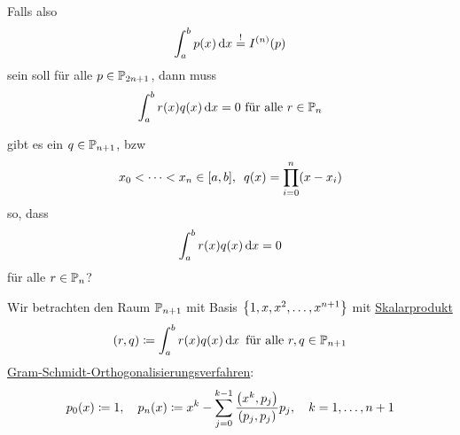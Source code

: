 \documentclass[../Skript.tex]{subfiles}
\begin{document}
Falls also \[
    \int_a^b p(x) \mathop{}\!\mathrm{d} x \overset{!}{=}I^{(n)}(p)\]
sein soll für alle $p\in\mathbb{P}_{2n+1}$, dann muss \[
    \int_a^b r(x) q(x) \mathop{}\!\mathrm{d} x = 0 \text{ für alle $r\in \mathbb{P}_n$}\]
\begin{question}
    gibt es ein $q\in \mathbb{P}_{n+1}$, bzw \[x_0 < \dots < x_n \in [a,b], 
    \hspace{.5em} q(x) = \prod_{i=0}^n(x-x_i)\]
    so, dass \[
        \int_a^b r(x)q(x)\mathop{}\!\mathrm{d} x = 0\]
    für alle $r\in \mathbb{P}_n$?
\end{question}
Wir betrachten den Raum $\mathbb{P}_{n+1}$ mit Basis $\left\{ 1,x,x^2,
\dots,x^{n+1} \right\}$ mit
\underline{Skalarprodukt} \[
    (r,q)\coloneqq \int_a^b r(x)q(x)\mathop{}\!\mathrm{d} x\hspace{.5em} \text{für alle 
    }r,q\in\mathbb{P}_{n+1}\]
\underline{Gram-Schmidt-Orthogonalisierungsverfahren}:\[p_0(x) \coloneqq 
1, \largespace
p_n(x) \coloneqq x^k - \dsum_{j=0}^{k-1}\frac{\left(x^k, p_j\right)}
{\left(p_j,p_j\right)}p_j, \largespace \igb k 1 {n+1}\]
\end{document}
